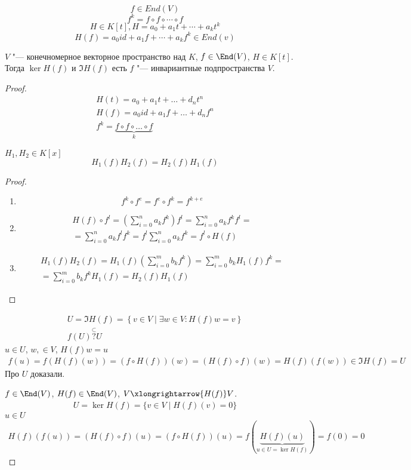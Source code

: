 $$f \in End(V)$$
$$f^{k} = f\circ f \circ \cdots \circ f$$
$$H \in K[t], H = a_0 + a_1t + \cdots + a_kt^{k}$$
$$H(f) = a_0 id + a_1f + \cdots + a_kf^k \in End(v)$$


\begin{theorem}
	$V$ "--- конечномерное векторное пространство над $K$, $f \in \End(V)$, $H \in K[t]$.
	Тогда $\ker H(f)$ и $\Im H(f)$ есть $f$ "--- инвариантные подпространства $V$.
\end{theorem}

\begin{proof}
	\begin{gather*}
		H(t) = a_0 + a_1 t + \dots + d_n t^n \\
		H(f) = a_0 id + a_1 f + \dots + d_n f^n \\
		f^k = \underbrace{f \circ f \circ \dots \circ f}_{k}
	\end{gather*}
	\begin{lemma}
		$H_1, H_2 \in K[x]$
		\[ H_1(f)H_2(f) = H_2(f)H_1(f) \]
	\end{lemma}
	\begin{proof}
		\begin{enumerate}
		\item
			\[ f^k \circ f^e = f^e \circ f^k = f^{k+e} \]

		\item
			\begin{gather*}
				H(f) \circ f^l = \left( \sum_{i=0}^n a_k f^k \right) f^l = \sum_{i=0}^n a_k f^k f^l = \\
				= \sum_{i=0}^n a_k f^l f^k = f^l \sum_{i=0}^n a_k f^k = f^l \circ H(f)
			\end{gather*}

		\item
			\begin{gather*}
				H_1(f) H_2(f) = H_1(f) \left( \sum_{i=0}^m b_k f^k \right) = \sum_{i=0}^m b_k H_1(f) f^k = \\
				= \sum_{i=0}^m b_k f^k H_1(f) = H_2(f) H_1(f)
			\end{gather*}
		\end{enumerate}
	\end{proof}
	\begin{gather*}
		U = \Im H(f) = \left\{ v \in V \mid \exists w \in V\colon H(f)w = v\right\} \\
		f(U) \stackrel{\subset}{?} U
	\end{gather*}
	$u \in U$, $w, \in V$, $H(f)w = u$
	\begin{gather*}
		f(u) = f(H(f)(w)) = (f \circ H(f))(w) = (H(f) \circ f)(w) = H(f) (f(w)) \in \Im H(f) = U
	\end{gather*}
	Про $U$ доказали.

	$f \in \End (V)$, $H(f) \in \End(V)$, $V \xlongrightarrow{H(f)} V$.
	\begin{gather*}
		U = \ker H(f) = \{v \in V \mid H(f)(v) = 0\} 
	\end{gather*}
	$u \in U$
	\begin{gather*}
		H(f)(f(u)) = (H(f) \circ f)(u) = (f \circ H(f))(u) = f (\underbrace{H(f)(u)}_{u \in U = \ker H(f)}) = f(0) = 0
	\end{gather*}
\end{proof}

